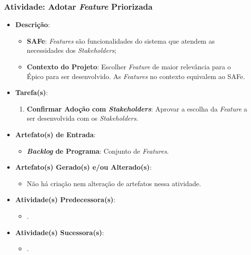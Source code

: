 			\subsubsection[Atividade: Adotar \emph{Feature} Priorizada]{Atividade: Adotar \emph{Feature} Priorizada}
			\label{subsubsec:processo_atividade_programa_adotar_feature}
				\begin{itemize}
					\item{\textbf{Descrição}:
						\begin{itemize}
							\item{\textbf{SAFe}: \emph{Features} são funcionalidades do sistema que atendem as necessidades dos \emph{Stakeholders};}
							\item{\textbf{Contexto do Projeto}: Escolher \emph{Feature} de maior relevância para o Épico para ser desenvolvido. As \emph{Features} no contexto equivalem ao SAFe.}
						\end{itemize}}
					\item{\textbf{Tarefa(s)}:
						\begin{enumerate}
							\item{\textbf{Confirmar Adoção com \emph{Stakeholders}}: Aprovar a escolha da \emph{Feature} a ser desenvolvida com os \emph{Stakeholders}.}
						\end{enumerate}}
					\item{\textbf{Artefato(s) de Entrada}:
						\begin{itemize}
							\item{\textbf{\emph{Backlog} de Programa}: Conjunto de \emph{Features}.}
						\end{itemize}}
					\item{\textbf{Artefato(s) Gerado(s) e/ou Alterado(s)}:
						\begin{itemize}
							\item{Não há criação nem alteração de artefatos nessa atividade.}
						\end{itemize}}
					\item{\textbf{Atividade(s) Predecessora(s)}:
						\begin{itemize}
							\item{.}
						\end{itemize}}
					\item{\textbf{Atividade(s) Sucessora(s)}:
						\begin{itemize}
							\item{.}
						\end{itemize}}
				\end{itemize}

